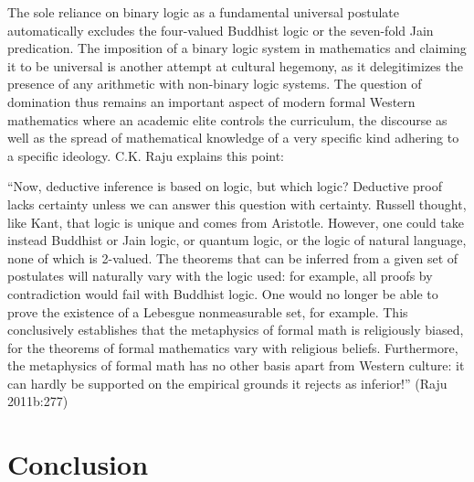 The sole reliance on binary logic as a fundamental universal postulate automatically excludes the four-valued Buddhist logic or the seven-fold Jain predication. The imposition of a binary logic system in mathematics and claiming it to be universal is another attempt at cultural hegemony, as it delegitimizes the presence of any arithmetic with non-binary logic systems. The question of domination thus remains an important aspect of modern formal Western mathematics where an academic elite controls the curriculum, the discourse as well as the spread of mathematical knowledge of a very specific kind adhering to a specific ideology. C.K. Raju explains this point: 
\begin{myquote}
``Now, deductive inference is based on logic, but which logic? Deductive proof lacks certainty unless we can answer this question with certainty. Russell thought, like Kant, that logic is unique and comes from Aristotle. However, one could take instead Buddhist or Jain logic, or quantum logic, or the logic of natural language, none of which is 2-valued. The theorems that can be inferred from a given set of postulates will naturally vary with the logic used: for example, all proofs by contradiction would fail with Buddhist logic. One would no longer be able to prove the existence of a Lebesgue nonmeasurable set, for example. This conclusively establishes that the metaphysics of formal math is religiously biased, for the theorems of formal mathematics vary with religious beliefs. Furthermore, the metaphysics of formal math has no other basis apart from Western culture: it can hardly be supported on the empirical grounds it rejects as inferior!''
\hfill (Raju 2011b:277)
\end{myquote}

\medskip

\section*{Conclusion}

